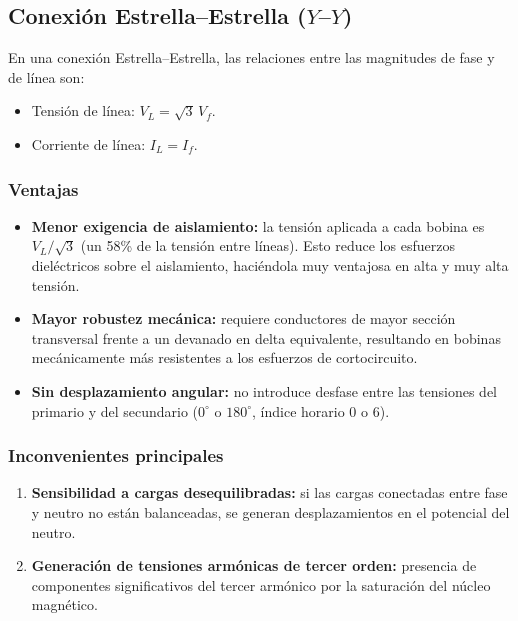 \documentclass[12pt]{article}
\begin{document}
\subsection{Conexi\'on Estrella--Estrella ($Y$--$Y$)}

En una conexi\'on Estrella--Estrella, las relaciones entre las magnitudes de fase y de l\'inea son:
\begin{itemize}
    \item Tensi\'on de l\'inea: $V_L=\sqrt{3}\,V_f$.
    \item Corriente de l\'inea: $I_L=I_f$.
\end{itemize}

\subsubsection*{Ventajas}
\begin{itemize}
    \item \textbf{Menor exigencia de aislamiento:} la tensi\'on aplicada a cada bobina es $V_L/\sqrt{3}$ (un 58\% de la tensi\'on entre l\'ineas). Esto reduce los esfuerzos diel\'ectricos sobre el aislamiento, haci\'endola muy ventajosa en alta y muy alta tensi\'on.
    \item \textbf{Mayor robustez mec\'anica:} requiere conductores de mayor secci\'on transversal frente a un devanado en delta equivalente, resultando en bobinas mec\'anicamente m\'as resistentes a los esfuerzos de cortocircuito.
    \item \textbf{Sin desplazamiento angular:} no introduce desfase entre las tensiones del primario y del secundario ($0^\circ$ o $180^\circ$, \'indice horario 0 o 6).
\end{itemize}

\subsubsection*{Inconvenientes principales}
\begin{enumerate}
    \item \textbf{Sensibilidad a cargas desequilibradas:} si las cargas conectadas entre fase y neutro no est\'an balanceadas, se generan desplazamientos en el potencial del neutro.
    \item \textbf{Generaci\'on de tensiones arm\'onicas de tercer orden:} presencia de componentes significativos del tercer arm\'onico por la saturaci\'on del n\'ucleo magn\'etico.
\end{enumerate}
\end{document}
